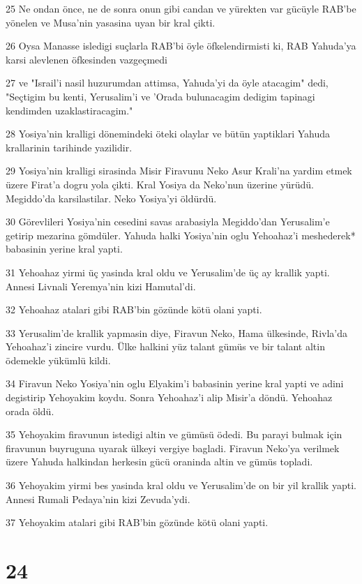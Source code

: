 \par 25 Ne ondan önce, ne de sonra onun gibi candan ve yürekten var gücüyle RAB'be yönelen ve Musa'nin yasasina uyan bir kral çikti.
\par 26 Oysa Manasse isledigi suçlarla RAB'bi öyle öfkelendirmisti ki, RAB Yahuda'ya karsi alevlenen öfkesinden vazgeçmedi
\par 27 ve "Israil'i nasil huzurumdan attimsa, Yahuda'yi da öyle atacagim" dedi, "Seçtigim bu kenti, Yerusalim'i ve 'Orada bulunacagim dedigim tapinagi kendimden uzaklastiracagim."
\par 28 Yosiya'nin kralligi dönemindeki öteki olaylar ve bütün yaptiklari Yahuda krallarinin tarihinde yazilidir.
\par 29 Yosiya'nin kralligi sirasinda Misir Firavunu Neko Asur Krali'na yardim etmek üzere Firat'a dogru yola çikti. Kral Yosiya da Neko'nun üzerine yürüdü. Megiddo'da karsilastilar. Neko Yosiya'yi öldürdü.
\par 30 Görevlileri Yosiya'nin cesedini savas arabasiyla Megiddo'dan Yerusalim'e getirip mezarina gömdüler. Yahuda halki Yosiya'nin oglu Yehoahaz'i meshederek* babasinin yerine kral yapti.
\par 31 Yehoahaz yirmi üç yasinda kral oldu ve Yerusalim'de üç ay krallik yapti. Annesi Livnali Yeremya'nin kizi Hamutal'di.
\par 32 Yehoahaz atalari gibi RAB'bin gözünde kötü olani yapti.
\par 33 Yerusalim'de krallik yapmasin diye, Firavun Neko, Hama ülkesinde, Rivla'da Yehoahaz'i zincire vurdu. Ülke halkini yüz talant gümüs ve bir talant altin ödemekle yükümlü kildi.
\par 34 Firavun Neko Yosiya'nin oglu Elyakim'i babasinin yerine kral yapti ve adini degistirip Yehoyakim koydu. Sonra Yehoahaz'i alip Misir'a döndü. Yehoahaz orada öldü.
\par 35 Yehoyakim firavunun istedigi altin ve gümüsü ödedi. Bu parayi bulmak için firavunun buyruguna uyarak ülkeyi vergiye bagladi. Firavun Neko'ya verilmek üzere Yahuda halkindan herkesin gücü oraninda altin ve gümüs topladi.
\par 36 Yehoyakim yirmi bes yasinda kral oldu ve Yerusalim'de on bir yil krallik yapti. Annesi Rumali Pedaya'nin kizi Zevuda'ydi.
\par 37 Yehoyakim atalari gibi RAB'bin gözünde kötü olani yapti.

\chapter{24}

